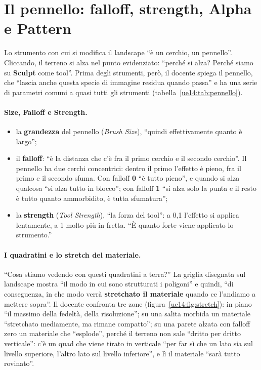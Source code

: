 \section{Il pennello: falloff, strength, Alpha e Pattern}
\label{ue14:sec:pennello}

Lo strumento con cui si modifica il landscape ``è un cerchio, un pennello''. Cliccando, il
terreno si alza nel punto evidenziato: ``perché si alza? Perché siamo su \textbf{Sculpt} come
tool''. Prima degli strumenti, però, il docente spiega il pennello, che ``lascia anche
questa specie di immagine residua quando passa'' e ha una serie di parametri comuni a quasi
tutti gli strumenti (tabella~\ref{ue14:tab:pennello}).

\paragraph{Size, Falloff e Strength.}
\begin{itemize}
  \item la \textbf{grandezza} del pennello (\emph{Brush Size}), ``quindi effettivamente quanto è
        largo'';
  \item il \textbf{falloff}: ``è la distanza che c'è fra il primo cerchio e il secondo
        cerchio''. Il pennello ha due cerchi concentrici: dentro il primo l'effetto è pieno,
        fra il primo e il secondo sfuma. Con falloff \textbf{0} ``è tutto pieno'', e quando si
        alza qualcosa ``si alza tutto in blocco''; con falloff \textbf{1} ``si alza solo la
        punta e il resto è tutto quanto ammorbidito, è tutta sfumatura'';
  \item la \textbf{strength} (\emph{Tool Strength}), ``la forza del tool'': a 0,1 l'effetto si
        applica lentamente, a 1 molto più in fretta. ``È quanto forte viene applicato lo
        strumento.''
\end{itemize}

\paragraph{I quadratini e lo stretch del materiale.} ``Cosa stiamo vedendo con questi
quadratini a terra?'' La griglia disegnata sul landscape mostra ``il modo in cui sono
strutturati i poligoni'' e quindi, ``di conseguenza, in che modo verrà \textbf{stretchato il
materiale} quando ce l'andiamo a mettere sopra''. Il docente confronta tre zone
(figura~\ref{ue14:fig:stretch}): in piano ``il massimo della fedeltà, della risoluzione''; su
una salita morbida un materiale ``stretchato mediamente, ma rimane compatto''; su una parete
alzata con falloff zero un materiale che ``esplode'', perché il terreno non sale ``dritto per
dritto verticale'': c'è un quad che viene tirato in verticale ``per far sì che un lato sia
sul livello superiore, l'altro lato sul livello inferiore'', e lì il materiale ``sarà tutto
rovinato''.

